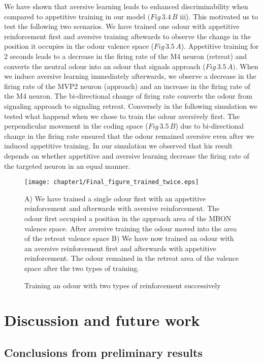 We have shown that aversive learning leads to enhanced discriminability
when compared to appetitive training in our model $(Fig\,3.4\,B$
iii). This motivated us to test the following two scenarios. We have
trained one odour with appetitive reinforcement first and aversive
training aftewards to observe the change in the position it occupies
in the odour valence space ($Fig\,3.5\,A$). Appetitive training for
2 seconds leads to a decrease in the firing rate of the M4 neuron
(retreat) and converts the neutral odour into an odour that signals
approach ($Fig\,3.5\,A)$. When we induce aversive learning immediately
afterwards, we observe a decrease in the firing rate of the MVP2 neuron
(approach) and an increase in the firing rate of the M4 neuron. The
bi-directional change of firing rate converts the odour from signaling
approach to signaling retreat. Conversely in the following simulation
we tested what happend when we chose to train the odour aversively
first. The perpendicular movement in the coding space ($Fig\,3.5\,B$)
due to bi-directional change in the firing rate ensured that the odour
remained aversive even after we induced appetitive training. In our
simulation we observed that his result depends on whether appetitive
and aversive learning decrease the firing rate of the targeted neuron
in an equal manner. 


\begin{figure}[H]
%
\texttt{[image: chapter1/Final\_figure\_trained\_twice.eps]} {\caption[text
to list of figures]{%
 Training an odour with two types of reinforcement successively%
}
}

A) We have trained a single odour first with an appetitive reinforcement
and afterwards with aversive reinforcement. The odour first occupied
a position in the approach area of the MBON valence space. After aversive
training the odour moved into the area of the retreat valence space
B) We have now trained an odour with an aversive reinforcement first
and afterwards with appetitive reinforcement. The odour remained in
the retreat area of the valence space after the two types of training. %
\end{figure}

\chapter{Discussion and future work}


\section{Conclusions from preliminary results}

